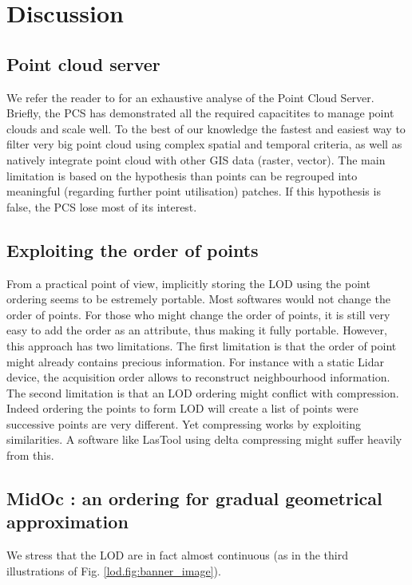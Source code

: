 

 \section{ Discussion }
	 \label{lod.sec:discussion} 
	 
	 \subsection{Point cloud server}
	\label{lod.par:pointcloudserver-limitation}
	We refer the reader to \cite{Cura2014} for an exhaustive analyse of the Point Cloud Server.
	Briefly, the PCS has demonstrated all the required capacitites to manage point clouds and scale well.
	To the best of our knowledge the fastest and easiest way to filter very big point cloud using complex spatial and temporal criteria, as well as natively integrate point cloud with other GIS data (raster, vector).
	The main limitation is based on the hypothesis than points can be regrouped into meaningful (regarding further point utilisation) patches. If this hypothesis is false, the PCS lose most of its interest.
	 
		 
	\subsection{Exploiting the order of points}
	From a practical point of view, implicitly storing the LOD using the point ordering
	seems to be estremely portable. Most softwares would not change the order of points.
	For those who might change the order of points, 
	it is still very easy to add the order as an attribute, thus making it fully portable.
	However, this approach has two limitations.
	The first limitation is that the order of point might already contains precious information. 
	For instance with a static Lidar device,
	the acquisition order allows to reconstruct neighbourhood information.
	The second limitation is that an LOD ordering might conflict with compression.
	Indeed ordering the points to form LOD will create a list of points were successive points are very different. Yet compressing works by exploiting similarities.
	A software like LasTool using delta compressing might suffer heavily from this. 
			 
	 \subsection{MidOc : an ordering for gradual geometrical approximation}
	 	We stress that the LOD are in fact almost continuous (as in the third illustrations of Fig.  \ref{lod.fig:banner_image}). 
		 	
